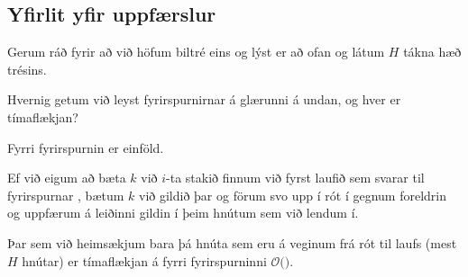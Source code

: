 \subsection{Yfirlit yfir uppfærslur}
{
    {
        \item<1-> Gerum ráð fyrir að við höfum biltré eins og lýst er að ofan og látum $H$ tákna hæð trésins.
        \item<2-> Hvernig getum við leyst fyrirspurnirnar á glærunni á undan, og hver er tímaflækjan?
        \item<3-> Fyrri fyrirspurnin er einföld.
        \item<4-> Ef við eigum að bæta $k$ við $i$-ta stakið finnum við fyrst laufið sem svarar til fyrirspurnar ,
                    bætum $k$ við gildið þar og förum svo upp í rót í gegnum foreldrin og uppfærum á leiðinni gildin í þeim hnútum sem við lendum í.
        \item<5-> Þar sem við heimsækjum bara þá hnúta sem eru á veginum frá rót til laufs (mest $H$ hnútar)
                    er tímaflækjan á fyrri fyrirspurninni $\mathcal{O}($$)$.
    }
}


